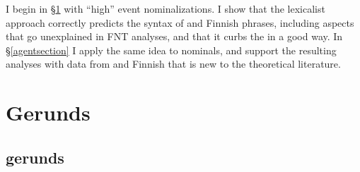 \documentclass[output=paper,
modfonts
]{LSP/langsci}
\begin{document}
I begin in \S\ref{gerundsection} with ``high'' event nominalizations.  I show that
the lexicalist approach correctly predicts the syntax of  and Finnish  phrases,
including aspects that go unexplained in FNT analyses, and that it curbs the  in a good
way.  In \S\ref{agentsection} I apply the same idea to  nominals, and support the
resulting analyses with data from   and Finnish that is new to the theoretical
literature.

\section{Gerunds}\label{gerundsection}\label{sec:kikarsky:2}
\subsection{ gerunds}
\end{document}
